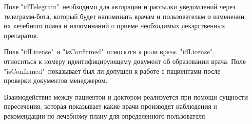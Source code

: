 \documentclass[14pt]{extreport}
\begin{document}
        \begin{table}[H]
            \caption{Описание атрибутов сущности "Пользователь".}
            \label{user-attrs-table}
        \end{table}

        Поле "idTelegram"\ необходимо для авторации и рассылки уведомлений через %
        телеграмм-бота, который будет напоминать врачам и пользователям о изменении их %
        лечебного плана и напоминаний о приеме необходимых лекарственных препаратов. 

        Поля "idLicense"\ и "isConfirmed"\ относятся к роли врача. "idLicense"\ %
        относиться к номеру идентифицирующему документ об образовании врача. %
        Поле "isConfirmed"\ показывает был ли допущен к работе с пациентами после %
        проверки документов менеджером. 

    \newpage

    Взаимодействие между пациентои и доктором реализуется при помощи сущности пересечения, %
    которая показывает какие врачи производят наблюдения и рекомендации по лечебному плану для %
    определенного пользователя.
\end{document}
